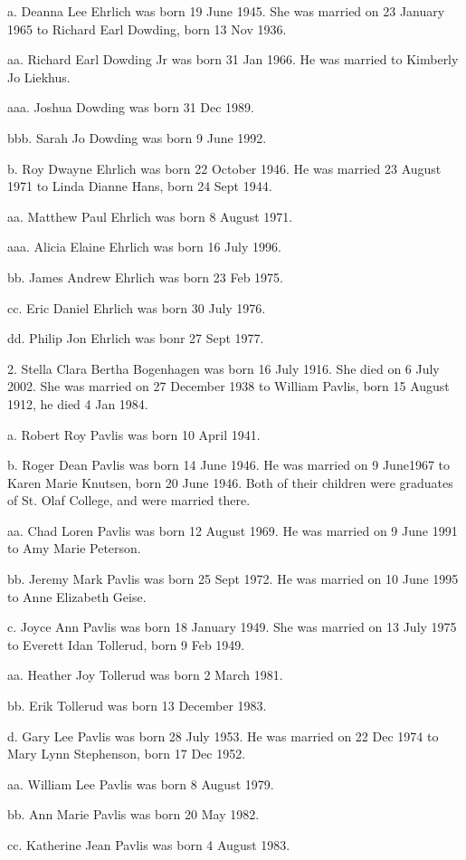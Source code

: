 \documentclass[a4paper]{article}
\begin{document}
a. Deanna Lee Ehrlich was born 19 June 1945.  She was married on 23 January 1965 to Richard Earl Dowding, born 13 Nov 1936.

aa. Richard Earl Dowding Jr was born 31 Jan 1966. He was married to Kimberly Jo Liekhus.

aaa. Joshua Dowding was born 31 Dec 1989.

bbb. Sarah Jo Dowding was born 9 June 1992. 

b. Roy Dwayne Ehrlich was born 22 October 1946.  He was married 23 August 1971 to Linda Dianne Hans, born 24 Sept 1944.

aa. Matthew Paul Ehrlich was born 8 August 1971.

aaa. Alicia Elaine Ehrlich was born 16 July 1996.

bb. James Andrew Ehrlich was born 23 Feb 1975.

cc. Eric Daniel Ehrlich was born 30 July 1976.

dd. Philip Jon Ehrlich was bonr 27 Sept 1977.

2. Stella Clara Bertha Bogenhagen was born 16 July 1916. She died on 6 July 2002.  She was married on 27 December 1938 to William Pavlis, born 15 August 1912, he died 4 Jan 1984.

a. Robert Roy Pavlis was born 10 April 1941.

b. Roger Dean Pavlis was born 14 June 1946.  He was married on 9 June1967 to Karen Marie Knutsen, born 20 June 1946.  Both of their children were graduates of St. Olaf College, and were married there.

aa. Chad Loren Pavlis was born 12 August 1969.  He was married on 9 June 1991 to Amy Marie Peterson.

bb. Jeremy Mark Pavlis was born 25 Sept 1972.  He was married on 10 June 1995 to Anne Elizabeth Geise.

c. Joyce Ann Pavlis was born 18 January 1949.  She was married on 13 July 1975 to Everett Idan Tollerud, born 9 Feb 1949.

aa. Heather Joy Tollerud was born 2 March 1981.

bb. Erik Tollerud was born 13 December 1983.  

d. Gary Lee Pavlis was born 28 July 1953.  He was married on 22 Dec 1974 to Mary Lynn Stephenson, born 17 Dec 1952.
 
aa. William Lee Pavlis was born 8 August 1979.

bb. Ann Marie Pavlis was born 20 May 1982.

cc. Katherine Jean Pavlis was born 4 August 1983.
\end{document}
